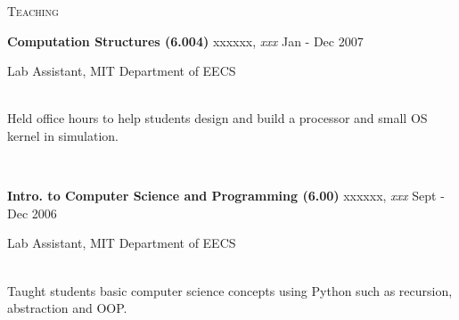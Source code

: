 \documentclass[10pt,times]{report}
\newlength{\sectiongap}
\newlength{\entrygap}
\newlength{\sectioncolwidth}
\newlength{\colgap}
\newlength{\stuffwidth}
\def\ifEqString#1#2{\def\testa{#1}\def\testb{#2}%
  \ifx\testa\testb}
\newenvironment{rtable}{
  \begin{minipage}{\textwidth}
  }{
  \end{minipage}
}
\newenvironment{rentry}[3][xxx]{
  \begin{minipage}[t]{\hsize}
    \textbf{#2}\ifEqString{#1}{xxx}\relax\else, \textit{#1}\fi
    \hspace{\stretch{1}} #3 \\
  }{
    \removelastskip
  \end{minipage}
  \\[\entrygap]  %
}
\newcommand{\rline}[2]{
  \begin{minipage}[t]{\hsize}
    #1 \hspace{\stretch{1}} #2
  \end{minipage} \\
}
\newenvironment{rsection}[1]{
  \begin{minipage}[t]{\sectioncolwidth}
    \textsc{#1}
  \end{minipage}
  \hspace{\colgap}
  \begin{minipage}[t]{\stuffwidth}
  }{
    \removelastskip
  \end{minipage}
  \\[\sectiongap]
}
\begin{document}
\begin{rtable}
\begin{rsection}{Teaching}
    \begin{rentry}{Computation Structures (6.004)}{Jan - Dec 2007}
      \rline{Lab Assistant, MIT Department of EECS}{} 
      Held office hours to help students design and build a processor
      and small OS kernel in simulation.
    \end{rentry}

    \begin{rentry}{Intro. to Computer Science and
        Programming (6.00)}{Sept - Dec 2006}
      \rline{Lab Assistant, MIT Department of EECS}{} 
      Taught students basic computer science concepts using Python
      such as recursion, abstraction and OOP.
    \end{rentry}
  \end{rsection}
\end{rtable}
\end{document}
